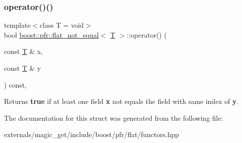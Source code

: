 \subsubsection{\texorpdfstring{operator()()}{operator()()}}
{\footnotesize\ttfamily template$<$class T  = void$>$ \\
bool \mbox{\hyperlink{structboost_1_1pfr_1_1flat__not__equal}{boost\+::pfr\+::flat\+\_\+not\+\_\+equal}}$<$ \mbox{\hyperlink{struct_t}{T}} $>$\+::operator() (\begin{DoxyParamCaption}\item[{const \mbox{\hyperlink{struct_t}{T}} \&}]{x,  }\item[{const \mbox{\hyperlink{struct_t}{T}} \&}]{y }\end{DoxyParamCaption}) const\hspace{0.3cm}{\ttfamily [inline]}, {\ttfamily [noexcept]}}

\begin{DoxyReturn}{Returns}
{\bfseries true} if at least one field {\bfseries x} not equals the field with same index of {\bfseries y}.
\end{DoxyReturn}


The documentation for this struct was generated from the following file\+:\begin{DoxyCompactItemize}
\item 
externals/magic\+\_\+get/include/boost/pfr/flat/functors.\+hpp\end{DoxyCompactItemize}
